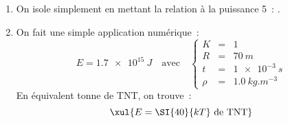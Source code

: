 \documentclass[../main/main.tex]{subfiles}
\begin{document}
{\begin{enumerate}
\begin{tcbraster}[raster columns=2, raster equal height=rows]
\begin{tcb}[]
			      \end{tcb}
		      \end{tcbraster}
		      \begin{tcb}(tool){Outils}

			      \begin{itemize}
				      \item $\dim{E} = \rm M\cdot L^2\cdot T^{-2}$~;
				      \item $\dim{t} = \rm T$~;
				      \item $\dim{\rho} = \rm M\cdot L^{-3}$.
			      \end{itemize}

		      \end{tcb}
		      \begin{tcb}[](appl){Application}
			      $\dim{R} = L$, donc on a
			      \[ L = \left( M\cdot L^2\cdot T^{-2} \right)^\alpha T^\beta \left(
				      M\cdot L^{-3} \right)^\gamma\]
			      Soit
			      \[\left\{
				      \begin{array}{rcl}
					      1 & = & 2\alpha - 3\gamma \\
					      0 & = & -2\alpha + \beta  \\
					      0 & = & \alpha + \gamma
				      \end{array}
				      \right.\Longleftrightarrow
				      \left\{
				      \begin{array}{rcl}
					      \alpha & = & -\gamma \\
					      \alpha & = & \beta/2 \\
					      \alpha & = & 1/5
				      \end{array}
				      \right.\]
			      Ainsi,
			      \[\left\{
				      \begin{array}{rcl}
					      \alpha & = & 1/5  \\
					      \gamma & = & -1/5 \\
					      \beta  & = & 2/5
				      \end{array}
				      \right.\]
			      Soit
			      \[R = K\times E^{1/5}t^{2/5}\rho^{-1/5}\]
		      \end{tcb}

		\item On isole simplement en mettant la relation à la puissance 5~: .

		\item On fait une simple application numérique~:
		      \[E = \SI{1.7e15}{J}\quad\text{avec}\quad \left\{
			      \begin{array}{rcl}
				      K    & = & 1                   \\
				      R    & = & \SI{70}{m}          \\
				      t    & = & \SI{1e-3}{s}        \\
				      \rho & = & \SI{1.0}{kg.m^{-3}}
			      \end{array}
			      \right.\]
		      En équivalent tonne de TNT, on trouve~:
		      \[\xul{E = \SI{40}{kT}\text{ de TNT}}\]
	\end{enumerate}
}
\end{document}
